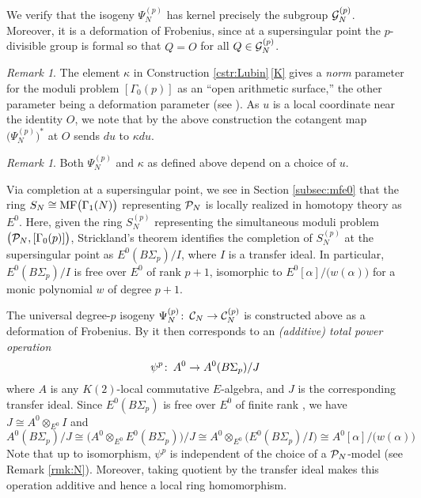 \documentclass{gtpart}
\theoremstyle{definition}
\theoremstyle{remark}
\newtheorem{rmk}[equation]{Remark}
\def\co{\colon\thinspace}
\newcommand{\CC}{{\cal C}}
\newcommand{\CG}{{\cal G}}
\newcommand{\CP}{{\cal P}}
\newcommand{\MF}{{\rm MF}}
\newcommand{\A}{\alpha}
\newcommand{\G}{\Gamma}
\newcommand{\K}{\kappa}
\renewcommand{\=}{\approx}
\renewcommand{\-}{\sim}
\numberwithin{equation}{section}
\begin{document}
We verify that the isogeny $\Psi_N^{(p)}$ has kernel precisely the subgroup 
$\CG_N^{(p)}$.  Moreover, it is a deformation of Frobenius, since at a 
supersingular point the $p$-divisible group is formal so that $Q = O$ for all 
$Q \in \CG_N^{(p)}$.  

\begin{rmk}
 \label{rmk:K}
 The element $\K$ in Construction \ref{cstr:Lubin}\,\eqref{K} gives a {\em norm} 
 parameter for the moduli problem $[\G_0(p)]$ as an ``open arithmetic surface,'' 
 the other parameter being a deformation parameter (see \cite[Section 7.7]{KM}).  
 As $u$ is a local coordinate near the identity $O$, we note that by the above 
 construction the cotangent map $\big(\Psi_N^{(p)}\big)^*$ at $O$ sends $du$ to 
 $\K du$.  
\end{rmk}

\begin{rmk}
 \label{rmk:depend}
 Both $\Psi_N^{(p)}$ and $\K$ as defined above depend on a choice of $u$.  
\end{rmk}

Via completion at a supersingular point, we see in Section \ref{subsec:mfe0} 
that the ring $S_N \cong \MF\big(\G_1(N)\big)$ representing $\CP_N$ is locally 
realized in homotopy theory as $E^0$.  Here, given the ring $S_N^{(p)}$ 
representing the simultaneous moduli problem $\big(\CP_N,[\G_0(p)]\big)$, 
Strickland's theorem \cite[Theorem 1.1]{Str98} identifies the completion of 
$S_N^{(p)}$ at the supersingular point as $E^0(B\Sigma_p) / I$, where $I$ is a 
transfer ideal.  In particular, $E^0(B\Sigma_p) / I$ is free over $E^0$ of rank 
$p + 1$, isomorphic to $E^0[\A] / \big( w(\A) \big)$ for a monic polynomial $w$ 
of degree $p + 1$.  

The universal degree-$p$ isogeny $\Psi_N^{(p)} \co \CC_N \to \CC_N^{(p)}$ is 
constructed above as a deformation of Frobenius.  By \cite[Theorem B]{cong} it 
then corresponds to an {\em (additive) total power operation} 
\begin{equation}
 \label{psi}
 \psi^p \co A^0 \to A^0(B\Sigma_p) / J 
\end{equation}
where $A$ is any $K(2)$-local commutative $E$-algebra, and $J$ is the 
corresponding transfer ideal.  Since $E^0(B\Sigma_p)$ is free over $E^0$ of 
finite rank \cite[Theorem 3.2]{Str98}, we have $J \cong A^0 \otimes_{E^0} I$ and 
\[
 A^0(B\Sigma_p) / J \cong \big( A^0 \otimes_{E^0} E^0(B\Sigma_p) \big) / J \cong 
 A^0 \otimes_{E^0} \big( E^0(B\Sigma_p) / I \big) \cong 
 A^0[\A] / \big( w(\A) \big) 
\]
Note that up to isomorphism, $\psi^p$ is independent of the choice of a 
$\CP_N$-model (see Remark \ref{rmk:N}).  Moreover, taking quotient by the 
transfer ideal makes this operation additive and hence a local ring 
homomorphism.  
\end{document}
